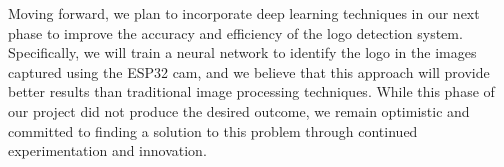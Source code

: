 Moving forward, we plan to incorporate deep learning techniques in our next phase to improve the accuracy and efficiency of the logo detection system. Specifically, we will train a neural network to identify the logo in the images captured using the ESP32 cam, and we believe that this approach will provide better results than traditional image processing techniques. While this phase of our project did not produce the desired outcome, we remain optimistic and committed to finding a solution to this problem through continued experimentation and innovation.
\newpage

%



%